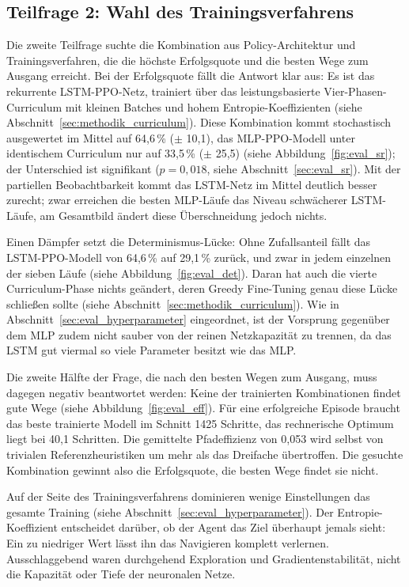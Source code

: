 \documentclass[
  a4paper,
  11pt,
  twoside,
  BCOR=8mm,           %
  headings=big,
  numbers=noenddot,
  listof=totoc,       %
  captions=tableheading,
]{scrreprt}
\begin{document}
\subsection*{Teilfrage 2: Wahl des Trainingsverfahrens}
Die zweite Teilfrage suchte die Kombination aus Policy-Architektur und Trainingsverfahren, die die höchste Erfolgsquote und die besten Wege zum Ausgang erreicht. Bei der Erfolgsquote fällt die Antwort klar aus: Es ist das rekurrente LSTM-PPO-Netz, trainiert über das leistungsbasierte Vier-Phasen-Curriculum mit kleinen Batches und hohem Entropie-Koeffizienten (siehe Abschnitt~\ref{sec:methodik_curriculum}). Diese Kombination kommt stochastisch ausgewertet im Mittel auf 64,6\,\% ($\pm$ 10,1), das MLP-PPO-Modell unter identischem Curriculum nur auf 33,5\,\% ($\pm$ 25,5) (siehe Abbildung~\ref{fig:eval_sr}); der Unterschied ist signifikant ($p = 0{,}018$, siehe Abschnitt~\ref{sec:eval_sr}). Mit der partiellen Beobachtbarkeit kommt das LSTM-Netz im Mittel deutlich besser zurecht; zwar erreichen die besten MLP-Läufe das Niveau schwächerer LSTM-Läufe, am Gesamtbild ändert diese Überschneidung jedoch nichts.

Einen Dämpfer setzt die Determinismus-Lücke: Ohne Zufallsanteil fällt das LSTM-PPO-Modell von 64,6\,\% auf 29,1\,\% zurück, und zwar in jedem einzelnen der sieben Läufe (siehe Abbildung~\ref{fig:eval_det}). Daran hat auch die vierte Curriculum-Phase nichts geändert, deren Greedy Fine-Tuning genau diese Lücke schließen sollte (siehe Abschnitt~\ref{sec:methodik_curriculum}). Wie in Abschnitt~\ref{sec:eval_hyperparameter} eingeordnet, ist der Vorsprung gegenüber dem MLP zudem nicht sauber von der reinen Netzkapazität zu trennen, da das LSTM gut viermal so viele Parameter besitzt wie das MLP.

Die zweite Hälfte der Frage, die nach den besten Wegen zum Ausgang, muss dagegen negativ beantwortet werden: Keine der trainierten Kombinationen findet gute Wege (siehe Abbildung~\ref{fig:eval_eff}). Für eine erfolgreiche Episode braucht das beste trainierte Modell im Schnitt 1425 Schritte, das rechnerische Optimum liegt bei 40,1 Schritten. Die gemittelte Pfadeffizienz von 0,053 wird selbst von trivialen Referenzheuristiken um mehr als das Dreifache übertroffen. Die gesuchte Kombination gewinnt also die Erfolgsquote, die besten Wege findet sie nicht.

Auf der Seite des Trainingsverfahrens dominieren wenige Einstellungen das gesamte Training (siehe Abschnitt~\ref{sec:eval_hyperparameter}). Der Entropie-Koeffizient entscheidet darüber, ob der Agent das Ziel überhaupt jemals sieht: Ein zu niedriger Wert lässt ihn das Navigieren komplett verlernen. Ausschlaggebend waren durchgehend Exploration und Gradientenstabilität, nicht die Kapazität oder Tiefe der neuronalen Netze.
\end{document}
